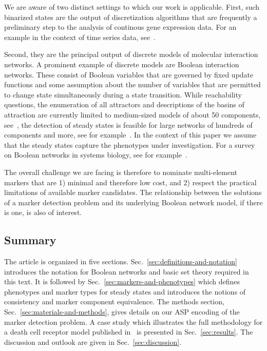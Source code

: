 \documentclass[11pt]{article}
\begin{document}
    We are aware of two distinct settings to which our work is applicable.
    First, such binarized states are the output of discretization algorithms that are frequently a preliminary step to the analysis of continous gene expression data.
    For an example in the context of time series data, see~\cite{dimitrova2010discretization}.

    Second, they are the principal output of discrete models of molecular interaction networks.
    A prominent example of discrete models are Boolean interaction networks.
    These consist of Boolean variables that are governed by fixed update functions and some assumption about the number of variables that are permitted to change state simultaneously during a state transition.
    While reachability questions, the enumeration of all attractors and descriptions of the basins of attraction are currently limited to medium-sized models of about 50 components, see~\cite{klarner2018basins}, the detection of steady states is feasible for large networks of hundreds of components and more, see for example~\cite{aracena2021finding}.
    In the context of this paper we assume that the steady states capture the phenotypes under investigation.
    For a survey on Boolean networks in systems biology, see for example~\cite{wang2012boolean, schwab2020concepts}.

    The overall challenge we are facing is therefore to nominate multi-element markers that are 1) minimal and therefore low cost, and 2) respect the practical limitations of available marker candidates.
    The relationship between the solutions of a marker detection problem and its underlying Boolean network model, if there is one, is also of interest.

    \subsection{Summary}
    The article is organized in five sections.
    Sec.~\ref{sec:definitions-and-notation} introduces the notation for Boolean networks and basic set theory required in this text.
    It is followed by Sec.~\ref{sec:markers-and-phenotypes} which defines phenotypes and marker types for steady states and introduces the notions of consistency and marker component equivalence.
    The methods section, Sec.~\ref{sec:materials-and-methods}, gives details on our ASP encoding of the marker detection problem.
    A case study which illustrates the full methodology for a death cell receptor model published in~\cite{calzone2010mathematical} is presented in Sec.~\ref{sec:results}.
    The discussion and outlook are given in Sec.~\ref{sec:discussion}.
\end{document}
